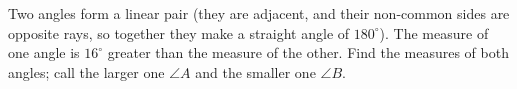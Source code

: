 Two angles form a linear pair (they are adjacent, and their non-common sides are opposite rays, so together they make a straight angle of $180^\circ$). The measure of one angle is $16^\circ$ greater than the measure of the other. Find the measures of both angles; call the larger one $\angle A$ and the smaller one $\angle B$.
